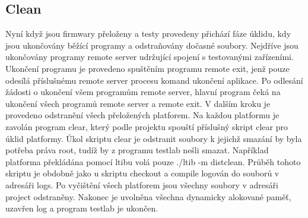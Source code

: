 \subsection{Clean}
Nyní když jsou firmwary přeloženy a testy provedeny přichází fáze úklidu, kdy jsou ukončovány běžící programy a odstraňovány dočasné soubory. Nejdříve jsou ukončovány programy remote server udržující spojení s testovanými zařízeními. Ukončení programu je provedeno spuštěním programu remote exit, jenž pouze odesílá příslušnému remote server procesu komand ukončení aplikace. Po odlesání žádosti o ukončení všem programům remote server, hlavní program čeká na ukončení všech programů remote server a remote exit. V dalším kroku je provedeno odstranění všech přeložených platforem. Na každou platformu je zavolán program clear, který podle projektu spouští příslušný skript clear pro úklid platformy. Úkol skriptu clear je odstranit soubory k jejichž smazání by byla potřeba práva root, tudíž by z programu testlab nešli smazat. Například platforma překládána pomocí ltibu volá pouze ./ltib -m distclean. Průběh tohoto skriptu je obdobně jako u skriptu checkout a compile logován do souborů v adresáři logs. Po vyčištění všech platforem jsou všechny soubory v adresáři project odstraněny. Nakonec je uvolněna všechna dynamicky alokované paměť, uzavřen log a program testlab je ukončen.

\endinput
